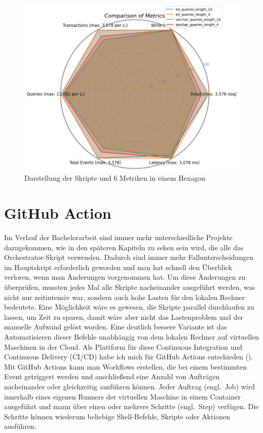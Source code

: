 \begin{figure}[H]
    \centering
    \includegraphics[width=.6\textwidth]{PNGs/Script/Join_Typ/join-type/statistics}
    \caption[Join-Typ: Hexagon-Diagramm]{Darstellung der Skripte und 6 Metriken in einem Hexagon}
    \label{fig:join-typ-hex}
\end{figure}

\section{GitHub Action}\label{sec:github-action}

Im Verlauf der Bachelorarbeit sind immer mehr unterschiedliche Projekte dazugekommen, wie in den späteren Kapiteln zu sehen sein wird, die alle das Orchestrator-Skript verwenden.
Dadurch sind immer mehr Fallunterscheidungen im Hauptskript erforderlich geworden und man hat schnell den Überblick verloren, wenn man Änderungen vorgenommen hat.
Um diese Änderungen zu überprüfen, mussten jedes Mal alle Skripte nacheinander ausgeführt werden, was nicht nur zeitintensiv war, sondern auch hohe Lasten für den lokalen Rechner bedeutete.
Eine Möglichkeit wäre es gewesen, die Skripte parallel durchlaufen zu lassen, um Zeit zu sparen, damit wäre aber nicht das Lastenproblem und der manuelle Aufwand gelöst worden.
Eine deutlich bessere Variante ist das Automatisieren dieser Befehle unabhängig von dem lokalen Rechner auf virtuellen Maschinen in der Cloud.
Als Plattform für diese Continuous Integration und Continuous Delivery (CI/CD) habe ich mich für GitHub Actions entschieden (\cite{github_action_doku}).
Mit GitHub Actions kann man Workflows erstellen, die bei einem bestimmten Event getriggert werden und anschließend eine Anzahl von Aufträgen nacheinander oder gleichzeitig ausführen können.
Jeder Auftrag (engl.\ Job) wird innerhalb eines eigenen Runners der virtuellen Maschine in einem Container ausgeführt und mann über einen oder mehrere Schritte (engl.\ Step) verfügen.
Die Schritte können wiederum beliebige Shell-Befehle, Skripte oder Aktionen ausführen.


